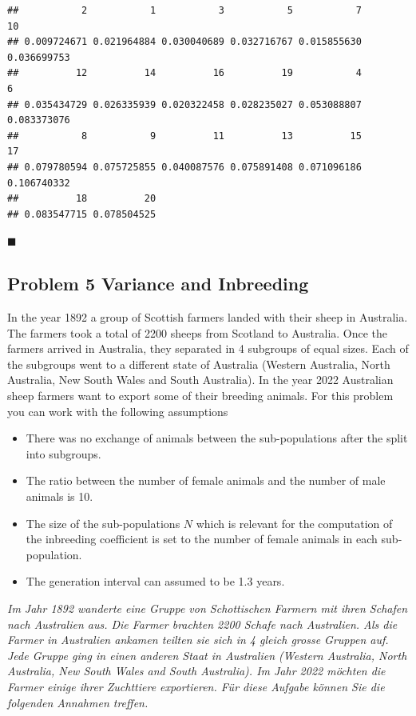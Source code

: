 \documentclass[
]{article}
\providecommand{\tightlist}{%
  \setlength{\itemsep}{0pt}\setlength{\parskip}{0pt}}
\newcommand{\solend}
{\vspace{2ex}$\blacksquare$}
\begin{document}
\begin{verbatim}
##           2           1           3           5           7          10 
## 0.009724671 0.021964884 0.030040689 0.032716767 0.015855630 0.036699753 
##          12          14          16          19           4           6 
## 0.035434729 0.026335939 0.020322458 0.028235027 0.053088807 0.083373076 
##           8           9          11          13          15          17 
## 0.079780594 0.075725855 0.040087576 0.075891408 0.071096186 0.106740332 
##          18          20 
## 0.083547715 0.078504525
\end{verbatim}

\solend

\clearpage
\pagebreak

\hypertarget{problem-5-variance-and-inbreeding}{%
\subsection{Problem 5 Variance and
Inbreeding}\label{problem-5-variance-and-inbreeding}}

In the year 1892 a group of Scottish farmers landed with their sheep in
Australia. The farmers took a total of 2200 sheeps from Scotland to
Australia. Once the farmers arrived in Australia, they separated in 4
subgroups of equal sizes. Each of the subgroups went to a different
state of Australia (Western Australia, North Australia, New South Wales
and South Australia). In the year 2022 Australian sheep farmers want to
export some of their breeding animals. For this problem you can work
with the following assumptions

\begin{itemize}
\tightlist
\item
  There was no exchange of animals between the sub-populations after the
  split into subgroups.
\item
  The ratio between the number of female animals and the number of male
  animals is 10.
\item
  The size of the sub-populations \(N\) which is relevant for the
  computation of the inbreeding coefficient is set to the number of
  female animals in each sub-population.
\item
  The generation interval can assumed to be 1.3 years.
\end{itemize}

\textit{Im Jahr 1892 wanderte eine Gruppe von Schottischen Farmern mit ihren Schafen nach Australien aus. Die Farmer brachten 2200 Schafe nach Australien. Als die Farmer in Australien ankamen teilten sie sich in 4 gleich grosse Gruppen auf. Jede Gruppe ging in einen anderen Staat in Australien (Western Australia, North Australia, New South Wales and South Australia). Im Jahr 2022 möchten die Farmer einige ihrer Zuchttiere exportieren. Für diese Aufgabe können Sie die folgenden Annahmen treffen.}
\end{document}
